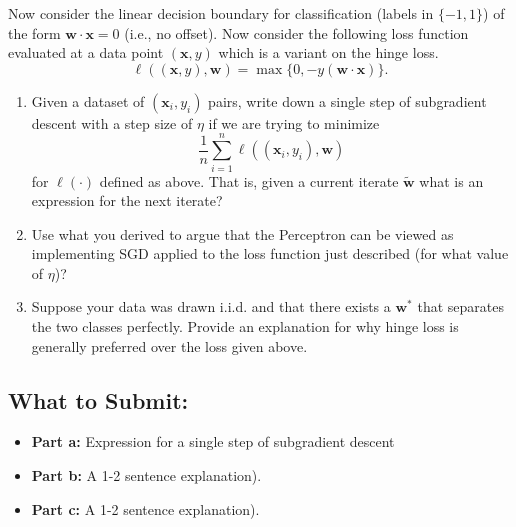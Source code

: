 \documentclass{article}
\begin{document}
\begin{bprob}
    Now consider the linear decision boundary for classification (labels in $\{-1,1\}$) of the form
    $\mathbf{w}\cdot \mathbf{x} = 0$ (i.e., no offset).
    Now consider the following loss function evaluated at a data point $(\mathbf{x}, y)$ which is a variant on the hinge loss.
    $$\ell((\mathbf{x},y), \mathbf{w})  = \max \{ 0, -y (\mathbf{w}\cdot \mathbf{x})\}.$$
    \begin{enumerate}
        \item {} Given a dataset of $(\mathbf{x}_i,y_i)$ pairs, write down a single step of subgradient descent with a step size of $\eta$ if we are trying to minimize
        $$\frac{1}{n}\sum_{i=1}^n \ell((\mathbf{x}_i,y_i), \mathbf{w})$$
        for $\ell(\cdot)$ defined as above. That is, given a current iterate $\widetilde{\mathbf{w}}$ what is an expression for the next iterate?  
        \item {} Use what you derived to argue that the Perceptron can be viewed as implementing SGD applied to the loss function just described (for what value of $\eta$)?
        \item {} Suppose your data was drawn i.i.d. and that there exists a $\mathbf{w}^*$ that separates the two classes perfectly. Provide an explanation for why hinge loss is generally preferred over the loss given above. 
    \end{enumerate}
    
    \subsection*{What to Submit:}
    \begin{itemize}
        \item \textbf{Part a:} Expression for a single step of subgradient descent
        \item \textbf{Part b:} A 1-2 sentence explanation).
        \item \textbf{Part c:} A 1-2 sentence explanation).
    \end{itemize}
\end{bprob}
\end{document}
